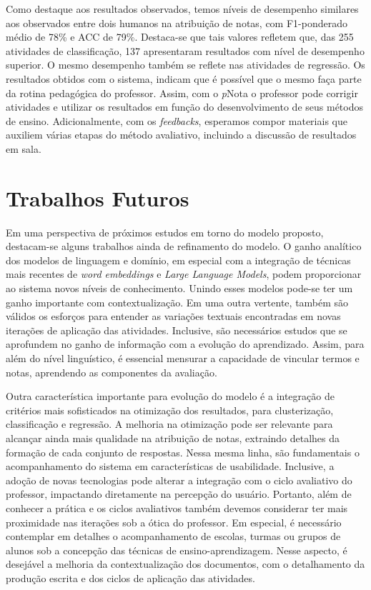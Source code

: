 Como destaque aos resultados observados, temos níveis de desempenho similares aos observados entre dois humanos na atribuição de notas, com F1-ponderado médio de 78\% e ACC de 79\%. Destaca-se que tais valores refletem que, das 255 atividades de classificação, 137 apresentaram resultados com nível de desempenho superior. O mesmo desempenho também se reflete nas atividades de regressão. Os resultados obtidos com o sistema, indicam que é possível que o mesmo faça parte da rotina pedagógica do professor. Assim, com o \textit{p}Nota o professor pode corrigir atividades e utilizar os resultados em função do desenvolvimento de seus métodos de ensino. Adicionalmente, com os \textit{feedbacks}, esperamos compor materiais que auxiliem várias etapas do método avaliativo, incluindo a discussão de resultados em sala.

\section{Trabalhos Futuros}

Em uma perspectiva de próximos estudos em torno do modelo proposto, destacam-se alguns trabalhos ainda de refinamento do modelo. O ganho analítico dos modelos de linguagem e domínio, em especial com a integração de técnicas mais recentes de \textit{word embeddings} e \textit{Large Language Models}, podem proporcionar ao sistema novos níveis de conhecimento. Unindo esses modelos pode-se ter um ganho importante com contextualização. Em uma outra vertente, também são válidos os esforços para entender as variações textuais encontradas em novas iterações de aplicação das atividades. Inclusive, são necessários estudos que se aprofundem no ganho de informação com a evolução do aprendizado. Assim, para além do nível linguístico, é essencial mensurar a capacidade de vincular termos e notas, aprendendo as componentes da avaliação.

Outra característica importante para evolução do modelo é a integração de critérios mais sofisticados na otimização dos resultados, para clusterização, classificação e regressão. A melhoria na otimização pode ser relevante para alcançar ainda mais qualidade na atribuição de notas, extraindo detalhes da formação de cada conjunto de respostas. Nessa mesma linha, são fundamentais o acompanhamento do sistema em características de usabilidade. Inclusive, a adoção de novas tecnologias pode alterar a integração com o ciclo avaliativo do professor, impactando diretamente na percepção do usuário. Portanto, além de conhecer a prática e os ciclos avaliativos também devemos considerar ter mais proximidade nas iterações sob a ótica do professor. Em especial, é necessário contemplar em detalhes o acompanhamento de escolas, turmas ou grupos de alunos sob a concepção das técnicas de ensino-aprendizagem. Nesse aspecto, é desejável a melhoria da contextualização dos documentos, com o detalhamento da produção escrita e dos ciclos de aplicação das atividades.
